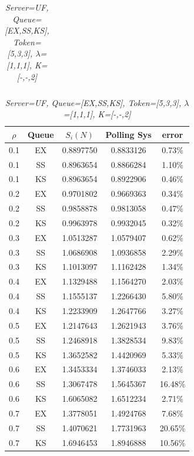 \documentclass[12pt,a4paper,italian]{article}
\begin{document}
\begin{table}[ht!]
\begin{minipage}[b]{0.48\linewidth}
\begin{tabular}{c c c c c}
		\end{tabular}
	\end{minipage}
	\hspace{0.5cm}
	\begin{minipage}[b]{0.48\linewidth}
		\centering
		\caption{\scriptsize \emph{Server=UF, Queue=[EX,SS,KS], Token=[5,3,3], $\lambda$=[1,1,1], K=[-,-,2]}}
		\label{tab18}
		\tiny
		\begin{tabular}{c c c c c}
			\hline
			$\rho$ & Queue & $S_i(N)$ & Polling Sys & error \\ \hline
			 0.1 & EX & 0.8897750 &   0.8833126    & 0.73\%  \\
			 0.1 & SS & 0.8963654 &   0.8866284    & 1.10\%  \\
			 0.1 & KS & 0.8963654 &   0.8922906    & 0.46\%  \\ \hline \hline
			 0.2 & EX & 0.9701802 &   0.9669363    & 0.34\%  \\
			 0.2 & SS & 0.9858878 &   0.9813058    & 0.47\%  \\
			 0.2 & KS & 0.9963978 &   0.9932045    & 0.32\%  \\ \hline \hline
			 0.3 & EX & 1.0513287 &   1.0579407    & 0.62\%  \\
			 0.3 & SS & 1.0686908 &   1.0936858    & 2.29\%  \\
			 0.3 & KS & 1.1013097 &   1.1162428    & 1.34\%  \\ \hline \hline
			 0.4 & EX & 1.1329488 &   1.1564270    & 2.03\%  \\
			 0.4 & SS & 1.1555137 &   1.2266430    & 5.80\%  \\
			 0.4 & KS & 1.2233909 &   1.2647766    & 3.27\%  \\ \hline \hline
			 0.5 & EX & 1.2147643 &   1.2621943    & 3.76\%  \\
			 0.5 & SS & 1.2468918 &   1.3828534    & 9.83\%  \\
			 0.5 & KS & 1.3652582 &   1.4420969    & 5.33\%  \\ \hline \hline
			 0.6 & EX & 1.3453334 &   1.3746033    & 2.13\%  \\
			 0.6 & SS & 1.3067478 &   1.5645367    & 16.48\% \\
			 0.6 & KS & 1.6065082 &   1.6512234    & 2.71\%  \\ \hline \hline
			 0.7 & EX & 1.3778051 &   1.4924768    & 7.68\%  \\
			 0.7 & SS & 1.4070621 &   1.7731963    & 20.65\% \\
			 0.7 & KS & 1.6946453 &   1.8946888    & 10.56\% \\ \hline \hline

\end{tabular}
\end{minipage}
\end{table}
\end{document}
